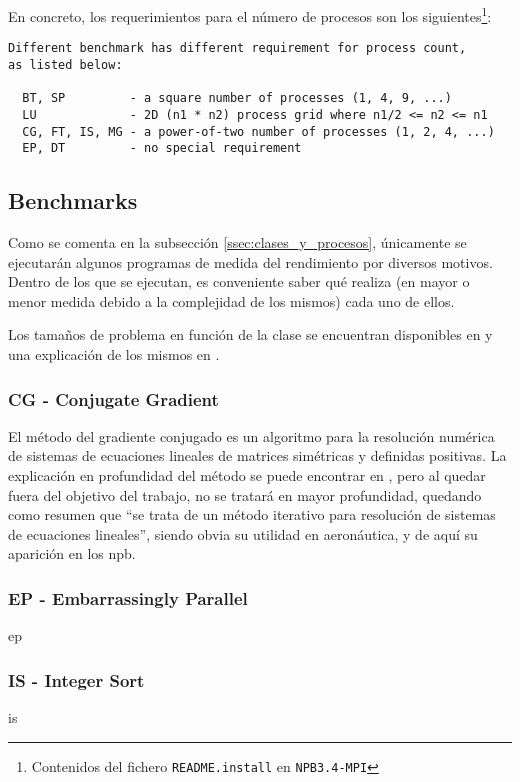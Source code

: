 En concreto, los requerimientos para el número de procesos son los siguientes\footnote{Contenidos del fichero \texttt{README.install} en \texttt{NPB3.4-MPI}}:

\begin{lstlisting}
Different benchmark has different requirement for process count,
as listed below:

  BT, SP         - a square number of processes (1, 4, 9, ...)
  LU             - 2D (n1 * n2) process grid where n1/2 <= n2 <= n1
  CG, FT, IS, MG - a power-of-two number of processes (1, 2, 4, ...)
  EP, DT         - no special requirement
\end{lstlisting}

\subsection{Benchmarks}
Como se comenta en la subsección \ref{ssec:clases_y_procesos}, únicamente se ejecutarán algunos programas de medida del rendimiento por diversos motivos. Dentro de los que se ejecutan, es conveniente saber qué realiza (en mayor o menor medida debido a la complejidad de los mismos) cada uno de ellos.

Los tamaños de problema en función de la clase se encuentran disponibles en \cite{npb_problem_sizes} y una explicación de los mismos en \cite{benchmarks1994technical}. 

\subsubsection{CG - Conjugate Gradient}
El método del gradiente conjugado es un algoritmo para la resolución numérica de sistemas de ecuaciones lineales de matrices simétricas y definidas positivas. La explicación en profundidad del método se puede encontrar en \cite{hestenes1952methods}, pero al quedar fuera del objetivo del trabajo, no se tratará en mayor profundidad, quedando como resumen que ``se trata de un método iterativo para resolución de sistemas de ecuaciones lineales'', siendo obvia su utilidad en aeronáutica, y de aquí su aparición en los \acrlong{npb}.

\subsubsection{EP - Embarrassingly Parallel}
ep

\subsubsection{IS - Integer Sort}
is

